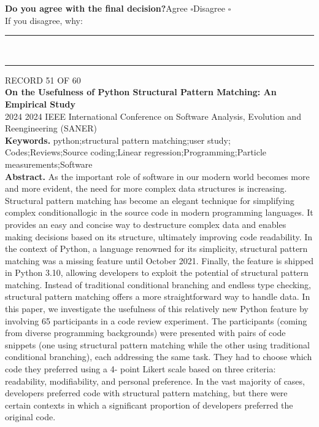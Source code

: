 \documentclass[11pt,a4paper]{article}
\begin{document}
{\small\textbf{Do you agree with the final decision?}\quad{}Agree $\square$\qquad{}Disagree $\square$}\\[1mm]
{\footnotesize\color{soft}If you disagree, why:}\\[1mm]
\color{rule}\rule{\linewidth}{0.3pt}\\[3mm]\rule{\linewidth}{0.3pt}\color{black}
\clearpage
{\color{soft}\footnotesize RECORD 51 OF 60}\\[1mm]
{\large\bfseries On the Usefulness of Python Structural Pattern Matching: An Empirical Study}\\[1.5mm]
{\color{soft}\small 2024 \textperiodcentered{} 2024 IEEE International Conference on Software Analysis, Evolution and Reengineering (SANER)}\\[2mm]
{\small\textbf{Keywords.} python;structural pattern matching;user study; Codes;Reviews;Source coding;Linear regression;Programming;Particle measurements;Software}\\[2mm]
{\small\textbf{Abstract.} As the important role of software in our modern world becomes more and more evident, the need for more complex data structures is increasing. Structural pattern matching has become an elegant technique for simplifying complex conditionallogic in the source code in modern programming languages. It provides an easy and concise way to destructure complex data and enables making decisions based on its structure, ultimately improving code readability. In the context of Python, a language renowned for its simplicity, structural pattern matching was a missing feature until October 2021. Finally, the feature is shipped in Python 3.10, allowing developers to exploit the potential of structural pattern matching. Instead of traditional conditional branching and endless type checking, structural pattern matching offers a more straightforward way to handle data. In this paper, we investigate the usefulness of this relatively new Python feature by involving 65 participants in a code review experiment. The participants (coming from diverse programming backgrounds) were presented with pairs of code snippets (one using structural pattern matching while the other using traditional conditional branching), each addressing the same task. They had to choose which code they preferred using a 4- point Likert scale based on three criteria: readability, modifiability, and personal preference. In the vast majority of cases, developers preferred code with structural pattern matching, but there were certain contexts in which a significant proportion of developers preferred the original code.}
\end{document}
